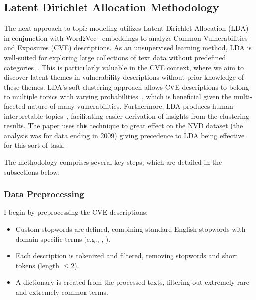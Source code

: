 \documentclass[12pt]{article}
\begin{document}
\subsection{Latent Dirichlet Allocation Methodology}

The next approach to topic modeling utilizes Latent Dirichlet Allocation (LDA)~\cite{lda_origin} in
conjunction with Word2Vec~\cite{word2vec} embeddings to analyze Common Vulnerabilities and Exposures
(CVE) descriptions. As an unsupervised learning method, LDA is well-suited for exploring large
collections of text data without predefined categories~\cite{lda_origin, latent_handbook}. This is
particularly valuable in the CVE context, where we aim to discover latent themes in vulnerability
descriptions without prior knowledge of these themes. LDA's soft clustering approach allows CVE
descriptions to belong to multiple topics with varying probabilities~\cite{latent_handbook}, which is beneficial given
the multi-faceted nature of many vulnerabilities. Furthermore, LDA produces human-interpretable
topics~\cite{lda_origin}, facilitating easier derivation of insights from the clustering results.
The paper \cite{cve_topic_modelling} uses this technique to great effect on the NVD
dataset (the analysis was for data ending in 2009) giving precedence to LDA being effective for this
sort of task.

The methodology comprises several key steps, which are detailed in the subsections below.

\subsubsection{Data Preprocessing} I begin by preprocessing the CVE descriptions:

\begin{itemize}

	\item Custom stopwords are defined, combining standard English stopwords with domain-specific
	      terms (e.g., , ).

	\item Each description is tokenized and filtered, removing stopwords and short tokens (length
	      $\leq 2$).

	\item A dictionary is created from the processed texts, filtering out extremely rare and
	      extremely common terms.

\end{itemize}
\end{document}
